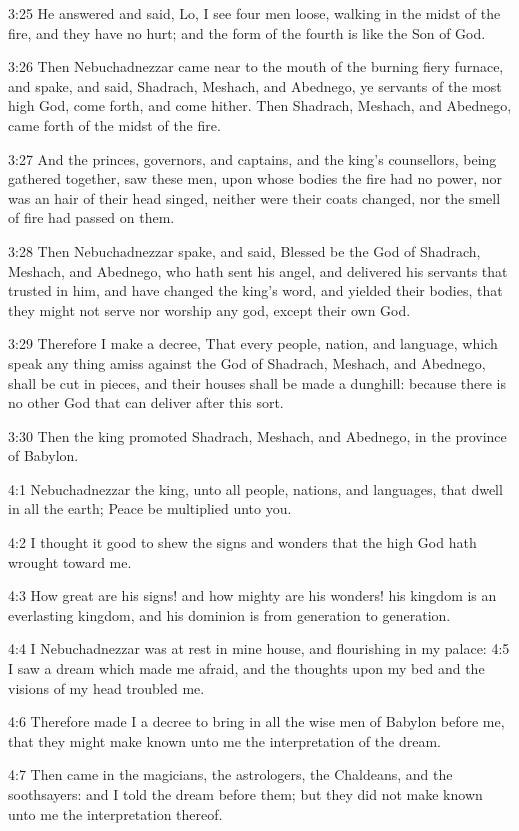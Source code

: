 3:25 He answered and said, Lo, I see four men loose, walking in the midst of the fire, and they have no hurt; and the form of the fourth is like the Son of God.

3:26 Then Nebuchadnezzar came near to the mouth of the burning fiery furnace, and spake, and said, Shadrach, Meshach, and Abednego, ye servants of the most high God, come forth, and come hither. Then Shadrach, Meshach, and Abednego, came forth of the midst of the fire.

3:27 And the princes, governors, and captains, and the king's counsellors, being gathered together, saw these men, upon whose bodies the fire had no power, nor was an hair of their head singed, neither were their coats changed, nor the smell of fire had passed on them.

3:28 Then Nebuchadnezzar spake, and said, Blessed be the God of Shadrach, Meshach, and Abednego, who hath sent his angel, and delivered his servants that trusted in him, and have changed the king's word, and yielded their bodies, that they might not serve nor worship any god, except their own God.

3:29 Therefore I make a decree, That every people, nation, and language, which speak any thing amiss against the God of Shadrach, Meshach, and Abednego, shall be cut in pieces, and their houses shall be made a dunghill: because there is no other God that can deliver after this sort.

3:30 Then the king promoted Shadrach, Meshach, and Abednego, in the province of Babylon.

4:1 Nebuchadnezzar the king, unto all people, nations, and languages, that dwell in all the earth; Peace be multiplied unto you.

4:2 I thought it good to shew the signs and wonders that the high God hath wrought toward me.

4:3 How great are his signs! and how mighty are his wonders! his kingdom is an everlasting kingdom, and his dominion is from generation to generation.

4:4 I Nebuchadnezzar was at rest in mine house, and flourishing in my palace: 4:5 I saw a dream which made me afraid, and the thoughts upon my bed and the visions of my head troubled me.

4:6 Therefore made I a decree to bring in all the wise men of Babylon before me, that they might make known unto me the interpretation of the dream.

4:7 Then came in the magicians, the astrologers, the Chaldeans, and the soothsayers: and I told the dream before them; but they did not make known unto me the interpretation thereof.

